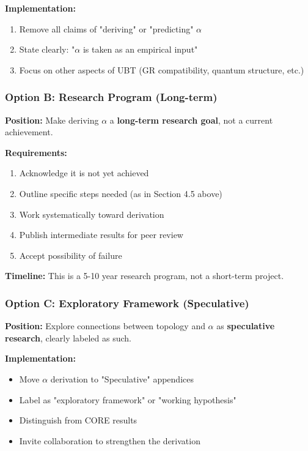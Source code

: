 \textbf{Implementation:}
\begin{enumerate}
\item Remove all claims of "deriving" or "predicting" $\alpha$
\item State clearly: "$\alpha$ is taken as an empirical input"
\item Focus on other aspects of UBT (GR compatibility, quantum structure, etc.)
\end{enumerate}

\subsubsection{Option B: Research Program (Long-term)}

\textbf{Position:} Make deriving $\alpha$ a \textbf{long-term research goal}, not a current achievement.

\textbf{Requirements:}
\begin{enumerate}
\item Acknowledge it is not yet achieved
\item Outline specific steps needed (as in Section 4.5 above)
\item Work systematically toward derivation
\item Publish intermediate results for peer review
\item Accept possibility of failure
\end{enumerate}

\textbf{Timeline:} This is a 5-10 year research program, not a short-term project.

\subsubsection{Option C: Exploratory Framework (Speculative)}

\textbf{Position:} Explore connections between topology and $\alpha$ as \textbf{speculative research}, clearly labeled as such.

\textbf{Implementation:}
\begin{itemize}
\item Move $\alpha$ derivation to "Speculative" appendices
\item Label as "exploratory framework" or "working hypothesis"
\item Distinguish from CORE results
\item Invite collaboration to strengthen the derivation
\end{itemize}

